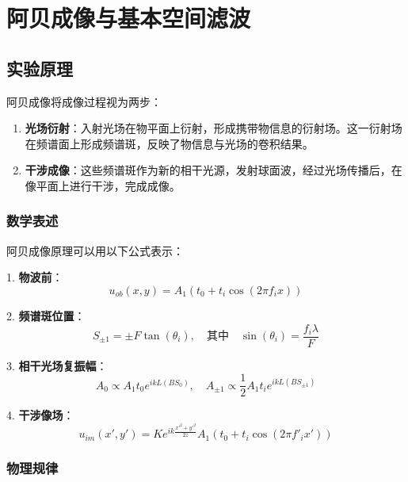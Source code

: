 \documentclass[zihao=5, UTF8]{article}
\theoremstyle{MyLineTheoremStyle} %
\theoremstyle{MyBlockTheoremStyle} %
\theoremstyle{MySubsubsectionStyle} %
\begin{document}
\section{阿贝成像与基本空间滤波}\thispagestyle{fancy} 

\subsection{实验原理}
阿贝成像将成像过程视为两步：

\begin{enumerate}
    \item \textbf{光场衍射}：入射光场在物平面上衍射，形成携带物信息的衍射场。这一衍射场在频谱面上形成频谱斑，反映了物信息与光场的卷积结果。
    
    \item \textbf{干涉成像}：这些频谱斑作为新的相干光源，发射球面波，经过光场传播后，在像平面上进行干涉，完成成像。
\end{enumerate}

\subsubsection{数学表述}

阿贝成像原理可以用以下公式表示：

1. \textbf{物波前}：
\begin{equation}
    u_{ob}(x, y) = A_1(t_0 + t_i \cos(2\pi f_i x))
\end{equation}

2. \textbf{频谱斑位置}：
\begin{equation}
    S_{\pm 1} = \pm F \tan(\theta_i), \quad \text{其中} \quad \sin(\theta_i) = \frac{f_i \lambda}{F}
\end{equation}

3. \textbf{相干光场复振幅}：
\begin{equation}
    A_0 \propto A_1 t_0 e^{ikL(B S_0)}, \quad A_{\pm 1} \propto \frac{1}{2} A_1 t_i e^{ikL(B S_{\pm 1})}
\end{equation}

4. \textbf{干涉像场}：
\begin{equation}
    u_{im}(x', y') = K e^{ik\frac{x'^2 + y'^2}{2z}} A_1(t_0 + t_i \cos(2\pi f'_i x'))
\end{equation}

\subsubsection{物理规律}
\end{document}
